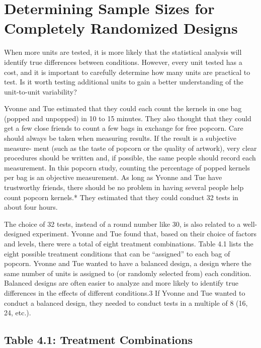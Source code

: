 \documentclass[
]{report}
\begin{document}
\section{Determining Sample Sizes for Completely Randomized Designs}\label{determining-sample-sizes-for-completely-randomized-designs}

When more units are tested, it is more likely that the statistical analysis will identify true differences between
conditions. However, every unit tested has a cost, and it is important to carefully determine how many units are
practical to test. Is it worth testing additional units to gain a better understanding of the unit-to-unit variability?

Yvonne and Tue estimated that they could each count the kernels in one bag (popped and unpopped) in
10 to 15 minutes. They also thought that they could get a few close friends to count a few bags in exchange
for free popcorn. Care should always be taken when measuring results. If the result is a subjective measure-
ment (such as the taste of popcorn or the quality of artwork), very clear procedures should be written and, if
possible, the same people should record each measurement. In this popcorn study, counting the percentage of
popped kernels per bag is an objective measurement. As long as Yvonne and Tue have trustworthy friends,
there should be no problem in having several people help count popcorn kernels.* They estimated that they
could conduct 32 tests in about four hours.

The choice of 32 tests, instead of a round number like 30, is also related to a well-designed experiment.
Yvonne and Tue found that, based on their choice of factors and levels, there were a total of eight treatment
combinations. Table 4.1 lists the eight possible treatment conditions that can be ``assigned'' to each bag of
popcorn. Yvonne and Tue wanted to have a balanced design, a design where the same number of units is
assigned to (or randomly selected from) each condition. Balanced designs are often easier to analyze and more
likely to identify true differences in the effects of different conditions.3 If Yvonne and Tue wanted to conduct
a balanced design, they needed to conduct tests in a multiple of 8 (16, 24, etc.).

\subsection{Table 4.1: Treatment Combinations}\label{table-4.1-treatment-combinations}
\end{document}

